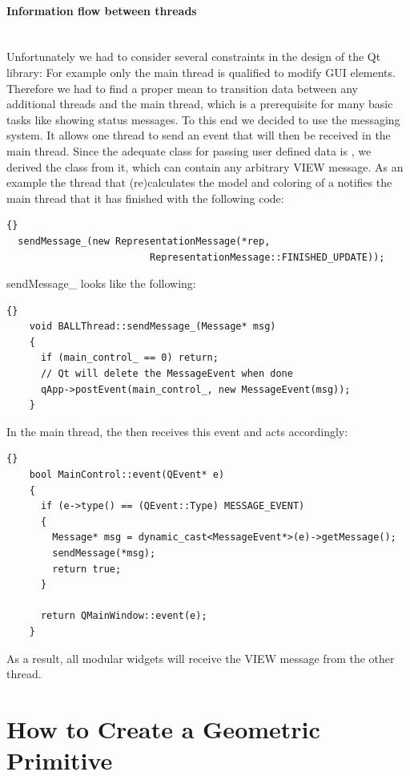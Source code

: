 \paragraph{Information flow between threads}
\hspace*{\fill}\\
Unfortunately we had to consider several constraints in the design of the Qt library: For example only the main thread 
is qualified to modify GUI elements. Therefore we had to find a proper mean to transition data between any additional 
threads and the main thread, which is a prerequisite for many basic tasks like showing status messages.
To this end we decided to use the  messaging system. It allows one thread to send an event that will
then be received in the main thread. Since the adequate class for passing user defined data
is , we derived the class  from it, which can contain any arbitrary VIEW message.
As an example the thread that (re)calculates the model and coloring of a  notifies the main thread
that it has finished with the following code:
\begin{lstlisting}{}
  sendMessage_(new RepresentationMessage(*rep,
                         RepresentationMessage::FINISHED_UPDATE));
\end{lstlisting}
sendMessage\_ looks like the following:
\begin{lstlisting}{}
    void BALLThread::sendMessage_(Message* msg)
    {
      if (main_control_ == 0) return;
      // Qt will delete the MessageEvent when done
      qApp->postEvent(main_control_, new MessageEvent(msg));
    }
\end{lstlisting}

In the main thread, the  then receives this event and acts
accordingly:
\begin{lstlisting}{}
    bool MainControl::event(QEvent* e)
    {
      if (e->type() == (QEvent::Type) MESSAGE_EVENT)
      {
        Message* msg = dynamic_cast<MessageEvent*>(e)->getMessage();
        sendMessage(*msg);
        return true;
      }

      return QMainWindow::event(e);
    }
\end{lstlisting}

As a result, all modular widgets will receive the VIEW message from the other
thread.


\section{How to Create a Geometric Primitive}
\label{section:view_create_a_geometric_primitive}

